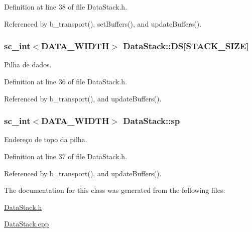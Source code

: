 Definition at line 38 of file Data\+Stack.\+h.



Referenced by b\+\_\+transport(), set\+Buffers(), and update\+Buffers().

\hypertarget{classDataStack_a8c2615faec0463346e10a5f067757490}{
\subsubsection[{D\+S}]{\setlength{\rightskip}{0pt plus 5cm}sc\+\_\+int$<${\bf D\+A\+T\+A\+\_\+\+W\+I\+D\+T\+H}$>$ Data\+Stack\+::\+D\+S\mbox{[}{\bf S\+T\+A\+C\+K\+\_\+\+S\+I\+Z\+E}\mbox{]}\hspace{0.3cm}{\ttfamily [private]}}}\label{classDataStack_a8c2615faec0463346e10a5f067757490}
Pilha de dados. 

Definition at line 36 of file Data\+Stack.\+h.



Referenced by b\+\_\+transport(), and update\+Buffers().

\hypertarget{classDataStack_ab3b029f3fe7bae405c3be8a024f393b0}{
\subsubsection[{sp}]{\setlength{\rightskip}{0pt plus 5cm}sc\+\_\+int$<${\bf D\+A\+T\+A\+\_\+\+W\+I\+D\+T\+H}$>$ Data\+Stack\+::sp\hspace{0.3cm}{\ttfamily [private]}}}\label{classDataStack_ab3b029f3fe7bae405c3be8a024f393b0}
Endereço de topo da pilha. 

Definition at line 37 of file Data\+Stack.\+h.



Referenced by b\+\_\+transport(), and update\+Buffers().



The documentation for this class was generated from the following files\+:\begin{DoxyCompactItemize}
\item 
\hyperlink{DataStack_8h}{Data\+Stack.\+h}\item 
\hyperlink{DataStack_8cpp}{Data\+Stack.\+cpp}\end{DoxyCompactItemize}
